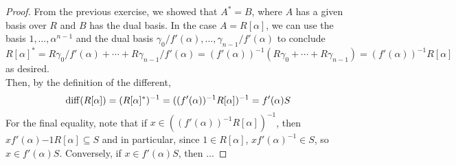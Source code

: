 \begin{proof}
	From the previous exercise, we showed that $A^\ast = B$, where $A$ has a given basis over $R$ and $B$ has the dual basis. In the case $A = R[\alpha]$, we can use the basis $1,\ldots,\alpha^{n-1}$ and the dual basis $\gamma_0/f'(\alpha),\ldots,\gamma_{n-1}/f'(\alpha)$ to conclude
	\[ R[\alpha]^\ast = R\gamma_0/f'(\alpha) + \cdots + R\gamma_{n-1}/f'(\alpha) = (f'(\alpha))^{-1}(R\gamma_0 + \cdots + R\gamma_{n-1}) = (f'(\alpha))^{-1}R[\alpha] \]
	as desired. \\
	
	Then, by the definition of the different,
	\[ \operatorname{diff}(R[\alpha]) = (R[\alpha]^\ast)^{-1} = ((f'(\alpha))^{-1}R[\alpha])^{-1} = f'(\alpha)S \]
	For the final equality, note that if $x \in ((f'(\alpha))^{-1}R[\alpha])^{-1}$, then $xf'(\alpha){-1}R[\alpha] \subseteq S$ and in particular, since $1 \in R[\alpha]$, $xf'(\alpha)^{-1} \in S$, so $x \in f'(\alpha)S$. Conversely, if $x \in f'(\alpha)S$, then ...
\end{proof}
